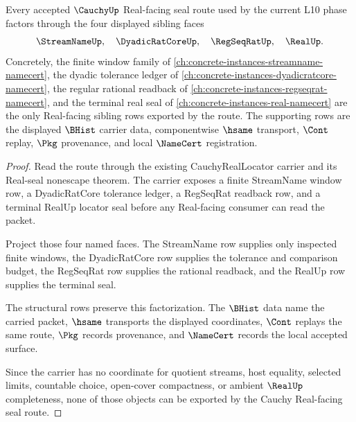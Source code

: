 \begin{theorem}
\label{thm:cauchy-l10-four-object-seal-route}
Every accepted $\CauchyUp$ Real-facing seal route used by the current L10 phase factors through the four displayed sibling faces
$$
\StreamNameUp,\quad \DyadicRatCoreUp,\quad \RegSeqRatUp,\quad \RealUp .
$$
Concretely, the finite window family of \autoref{ch:concrete-instances-streamname-namecert}, the dyadic tolerance ledger of \autoref{ch:concrete-instances-dyadicratcore-namecert}, the regular rational readback of \autoref{ch:concrete-instances-regseqrat-namecert}, and the terminal real seal of \autoref{ch:concrete-instances-real-namecert} are the only Real-facing sibling rows exported by the route. The supporting rows are the displayed $\BHist$ carrier data, componentwise $\hsame$ transport, $\Cont$ replay, $\Pkg$ provenance, and local $\NameCert$ registration.
\end{theorem}
\begin{proof}
Read the route through the existing CauchyRealLocator carrier and its Real-seal nonescape theorem. The carrier exposes a finite StreamName window row, a DyadicRatCore tolerance ledger, a RegSeqRat readback row, and a terminal RealUp locator seal before any Real-facing consumer can read the packet.

Project those four named faces. The StreamName row supplies only inspected finite windows, the DyadicRatCore row supplies the tolerance and comparison budget, the RegSeqRat row supplies the rational readback, and the RealUp row supplies the terminal seal.

The structural rows preserve this factorization. The $\BHist$ data name the carried packet, $\hsame$ transports the displayed coordinates, $\Cont$ replays the same route, $\Pkg$ records provenance, and $\NameCert$ records the local accepted surface.

Since the carrier has no coordinate for quotient streams, host equality, selected limits, countable choice, open-cover compactness, or ambient $\RealUp$ completeness, none of those objects can be exported by the Cauchy Real-facing seal route.
\end{proof}

